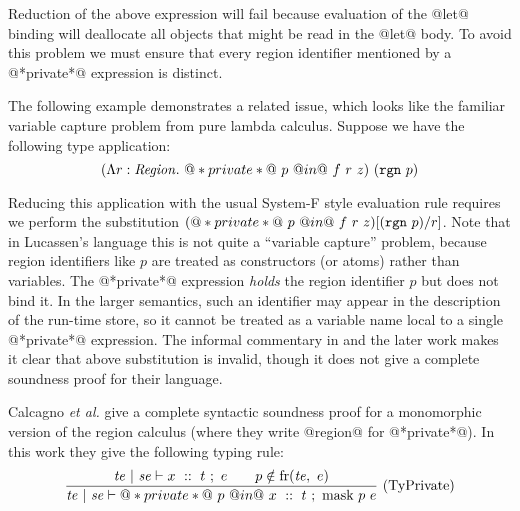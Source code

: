 Reduction of the above expression will fail because evaluation of the @let@ binding will deallocate all objects that might be read in the @let@ body. To avoid this problem we must ensure that every region identifier mentioned by a @*private*@ expression is distinct. 

The following example demonstrates a related issue, which looks like the familiar variable capture problem from pure lambda calculus. Suppose we have the following type application:
$$
(\Lambda r : \kcRegion.~ @*private*@~ p~ @in@ ~f ~r ~z)~ (\trgn{p})
$$

Reducing this application with the usual System-F style evaluation rule requires we perform the substitution $(@*private*@~ p~ @in@ ~f ~r~ z)[(\trgn{p})/r]$. Note that in Lucassen's language  this is not quite a ``variable capture'' problem, because region identifiers like $p$ are treated as constructors (or atoms) rather than variables. The @*private*@ expression \emph{holds} the region identifier $p$ but does not bind it. In the larger semantics, such an identifier may appear in the description of the run-time store, so it cannot be treated as a variable name local to a single @*private*@ expression. The informal commentary in \cite{Lucassen:types-and-effects} and the later work \cite{Lucassen:polymorphic-effects} makes it clear that above substitution is invalid, though it does not give a complete soundness proof for their language.

Calcagno \emph{et al.}  give a complete syntactic soundness proof for a monomorphic version of the region calculus (where they write @region@ for @*private*@). In this work they give the following typing rule:
$$
\ruleIL {TyPrivate}
        {    \mte ~|~ \mse \vdash x ~::~ t ~;~ e
         \qq p \notin \trm{fr}(\mte,~ e)}
        {\mte ~|~ \mse \vdash @*private*@~ p~ @in@~ x ~::~ t ~;~ \trm{mask}~ p~ e}
$$

